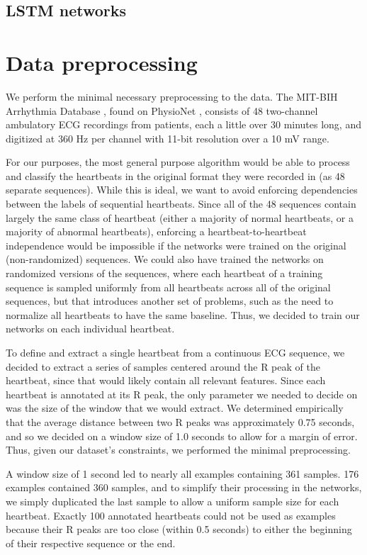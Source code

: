 \documentclass{article} %
\begin{document}
\subsection{LSTM networks}

\section{Data preprocessing}
We perform the minimal necessary preprocessing to the data. The MIT-BIH Arrhythmia Database \cite{Moody}, found on PhysioNet \cite{physionet}, consists of 48 two-channel ambulatory ECG recordings from patients, each a little over 30 minutes long, and digitized at 360 Hz per channel with 11-bit resolution over a 10 mV range.

For our purposes, the most general purpose algorithm would be able to process and classify the heartbeats in the original format they were recorded in (as 48 separate sequences). While this is ideal, we want to avoid enforcing dependencies between the labels of sequential heartbeats. Since all of the 48 sequences contain largely the same class of heartbeat (either a majority of normal heartbeats, or a majority of abnormal heartbeats), enforcing a heartbeat-to-heartbeat independence would be impossible if the networks were trained on the original (non-randomized) sequences. We could also have trained the networks on randomized versions of the sequences, where each heartbeat of a training sequence is sampled uniformly from all heartbeats across all of the original sequences, but that introduces another set of problems, such as the need to normalize all heartbeats to have the same baseline. Thus, we decided to train our networks on each individual heartbeat.

To define and extract a single heartbeat from a continuous ECG sequence, we decided to extract a series of samples centered around the R peak of the heartbeat, since that would likely contain all relevant features. Since each heartbeat is annotated at its R peak, the only parameter we needed to decide on was the size of the window that we would extract. We determined empirically that the average distance between two R peaks was approximately 0.75 seconds, and so we decided on a window size of 1.0 seconds to allow for a margin of error. Thus, given our dataset's constraints, we performed the minimal preprocessing.

A window size of 1 second led to nearly all examples containing 361 samples. 176 examples contained 360 samples, and to simplify their processing in the  networks, we simply duplicated the last sample to allow a uniform sample size for each heartbeat. Exactly 100 annotated heartbeats could not be used as examples because their R peaks are too close (within 0.5 seconds) to either the beginning of their respective sequence or the end.
\end{document}
